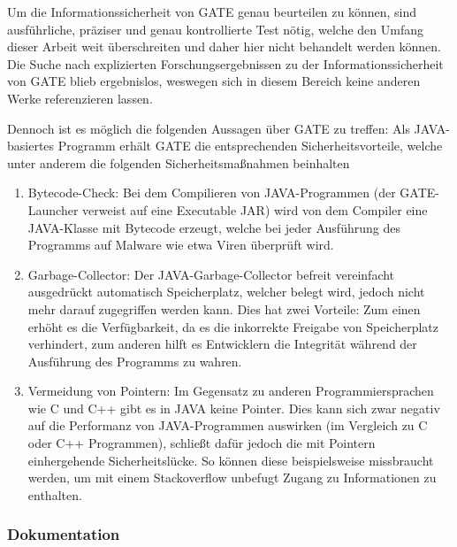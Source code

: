 \documentclass[12pt]{report}
\begin{document}
Um die Informationssicherheit von GATE genau beurteilen zu können, sind ausführliche, präziser und genau kontrollierte Test nötig, welche den Umfang dieser Arbeit weit überschreiten und daher hier nicht behandelt werden können. Die Suche nach explizierten Forschungsergebnissen zu der Informationssicherheit von GATE blieb ergebnislos, weswegen sich in diesem Bereich keine anderen Werke referenzieren lassen.

Dennoch ist es möglich die folgenden Aussagen über GATE zu treffen:
Als JAVA-basiertes Programm erhält GATE die entsprechenden Sicherheitsvorteile, welche unter anderem die folgenden Sicherheitsmaßnahmen beinhalten \cite{do18}
\begin{enumerate}
\item Bytecode-Check: Bei dem Compilieren von JAVA-Programmen (der GATE-Launcher verweist auf eine Executable JAR) wird von dem Compiler eine JAVA-Klasse mit Bytecode erzeugt, welche bei jeder Ausführung des Programms auf Malware wie etwa Viren überprüft wird. 
\item Garbage-Collector: Der JAVA-Garbage-Collector befreit vereinfacht ausgedrückt automatisch Speicherplatz, welcher belegt wird, jedoch nicht mehr darauf zugegriffen werden kann. Dies hat zwei Vorteile: Zum einen erhöht es die Verfügbarkeit, da es die inkorrekte Freigabe von Speicherplatz verhindert, zum anderen hilft es Entwicklern die Integrität während der Ausführung des Programms zu wahren. 
\item Vermeidung von Pointern: Im Gegensatz zu anderen Programmiersprachen wie C und C++ gibt es in JAVA keine Pointer. Dies kann sich zwar negativ auf die Performanz von JAVA-Programmen auswirken (im Vergleich zu C oder C++ Programmen), schließt dafür jedoch die mit Pointern einhergehende Sicherheitslücke. So können diese beispielsweise missbraucht werden, um mit einem Stackoverflow unbefugt Zugang zu Informationen zu enthalten. 
 
\end{enumerate}

\subsubsection{Dokumentation}
\end{document}
